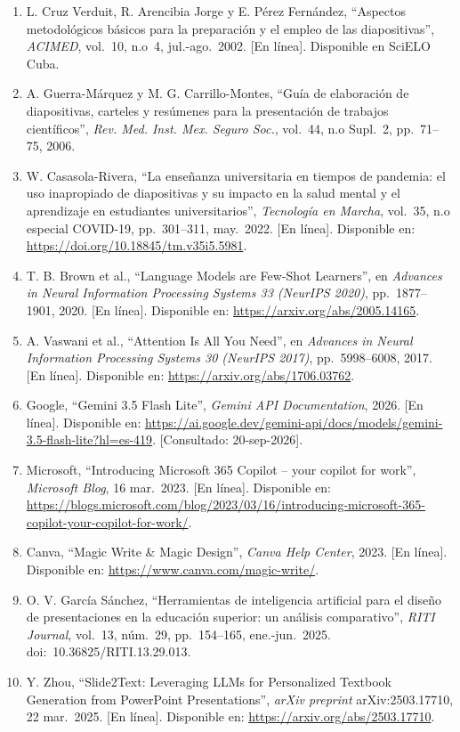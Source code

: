 \documentclass[11pt]{article}
\begin{document}
\begin{enumerate}
    \item L. Cruz Verduit, R. Arencibia Jorge y E. Pérez Fernández, ``Aspectos metodológicos básicos para la preparación y el empleo de las diapositivas'', \textit{ACIMED}, vol.~10, n.o~4, jul.-ago.~2002. [En línea]. Disponible en SciELO Cuba.
    \item A. Guerra-Márquez y M. G. Carrillo-Montes, ``Guía de elaboración de diapositivas, carteles y resúmenes para la presentación de trabajos científicos'', \textit{Rev. Med. Inst. Mex. Seguro Soc.}, vol.~44, n.o Supl.~2, pp.~71--75, 2006.
    \item W. Casasola-Rivera, ``La enseñanza universitaria en tiempos de pandemia: el uso inapropiado de diapositivas y su impacto en la salud mental y el aprendizaje en estudiantes universitarios'', \textit{Tecnología en Marcha}, vol.~35, n.o especial COVID-19, pp.~301--311, may.~2022. [En línea]. Disponible en: \url{https://doi.org/10.18845/tm.v35i5.5981}.
    \item T. B. Brown et al., ``Language Models are Few-Shot Learners'', en \textit{Advances in Neural Information Processing Systems 33 (NeurIPS 2020)}, pp.~1877--1901, 2020. [En línea]. Disponible en: \url{https://arxiv.org/abs/2005.14165}.
    \item A. Vaswani et al., ``Attention Is All You Need'', en \textit{Advances in Neural Information Processing Systems 30 (NeurIPS 2017)}, pp.~5998--6008, 2017. [En línea]. Disponible en: \url{https://arxiv.org/abs/1706.03762}.
    \item Google, ``Gemini 3.5 Flash Lite'', \textit{Gemini API Documentation}, 2026. [En línea]. Disponible en: \url{https://ai.google.dev/gemini-api/docs/models/gemini-3.5-flash-lite?hl=es-419}. [Consultado: 20-sep-2026].
    \item Microsoft, ``Introducing Microsoft 365 Copilot -- your copilot for work'', \textit{Microsoft Blog}, 16 mar.~2023. [En línea]. Disponible en: \url{https://blogs.microsoft.com/blog/2023/03/16/introducing-microsoft-365-copilot-your-copilot-for-work/}.
    \item Canva, ``Magic Write \& Magic Design'', \textit{Canva Help Center}, 2023. [En línea]. Disponible en: \url{https://www.canva.com/magic-write/}.
    \item O. V. García Sánchez, ``Herramientas de inteligencia artificial para el diseño de presentaciones en la educación superior: un análisis comparativo'', \textit{RITI Journal}, vol.~13, núm.~29, pp.~154--165, ene.-jun.~2025. doi:~10.36825/RITI.13.29.013.
    \item Y. Zhou, ``Slide2Text: Leveraging LLMs for Personalized Textbook Generation from PowerPoint Presentations'', \textit{arXiv preprint} arXiv:2503.17710, 22 mar.~2025. [En línea]. Disponible en: \url{https://arxiv.org/abs/2503.17710}.

\end{enumerate}
\end{document}
